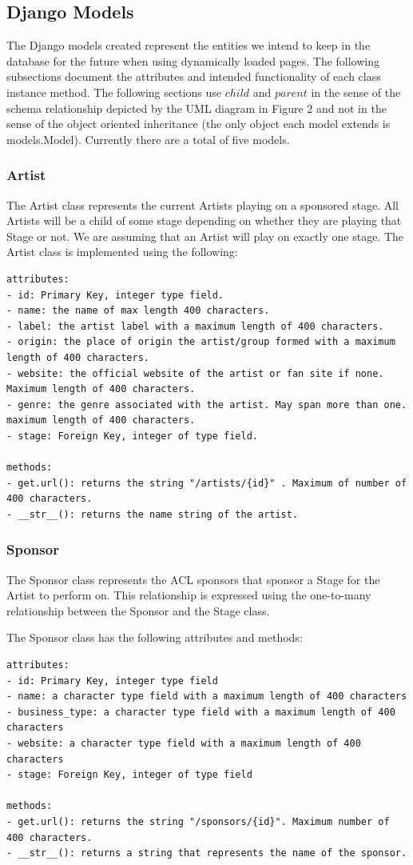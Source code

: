 \documentclass[12pt,english]{scrartcl}
\begin{document}
\subsection{Django Models}
The Django models created represent the entities we intend to keep in the database for the future when using dynamically loaded pages.
The following subsections document the attributes and intended functionality of each class instance method. The following sections use
$child$ and $parent$ in the sense of the schema relationship depicted by the UML diagram in Figure 2 and not in the sense of the object oriented inheritance 
(the only object each model extends is models.Model). Currently there are a total of five models.

\subsubsection{Artist}
The Artist class represents the current Artists playing on a sponsored stage. All Artists will be a child of some
stage depending on whether they are playing that Stage or not. We are assuming that an Artist will play on 
exactly one stage. The Artist class is implemented using the following:
\begin{verbatim}
attributes:
- id: Primary Key, integer type field.
- name: the name of max length 400 characters.
- label: the artist label with a maximum length of 400 characters.
- origin: the place of origin the artist/group formed with a maximum length of 400 characters.
- website: the official website of the artist or fan site if none. Maximum length of 400 characters.
- genre: the genre associated with the artist. May span more than one. maximum length of 400 characters.
- stage: Foreign Key, integer of type field.

methods:
- get.url(): returns the string "/artists/{id}" . Maximum of number of 400 characters.
- __str__(): returns the name string of the artist.
\end{verbatim}


\subsubsection{Sponsor}
The Sponsor class represents the ACL sponsors that sponsor a Stage for the Artist to perform on.
This relationship is expressed using the one-to-many relationship between the Sponsor and the Stage
class. 

The Sponsor class has the following attributes and methods:
\begin{verbatim}
attributes:
- id: Primary Key, integer type field
- name: a character type field with a maximum length of 400 characters
- business_type: a character type field with a maximum length of 400 characters
- website: a character type field with a maximum length of 400 characters
- stage: Foreign Key, integer of type field

methods:
- get.url(): returns the string "/sponsors/{id}". Maximum number of 400 characters.
- __str__(): returns a string that represents the name of the sponsor.
\end{verbatim}
\end{document}
